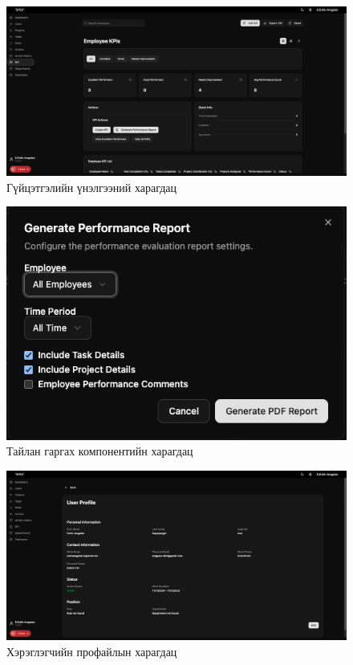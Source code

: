 \begin{figure}[H]
    \centering
    \includegraphics[scale=0.25]{src/images/uiux/kpi.png}
    \caption{Гүйцэтгэлийн үнэлгээний харагдац}
    \label{fig:kpi_page}
\end{figure}

\begin{figure}[H]
    \centering
    \includegraphics[scale=0.25]{src/images/uiux/reportgen.png}
    \caption{Тайлан гаргах компонентийн харагдац}
    \label{fig:report_gen_comp}
\end{figure}

\begin{figure}[H]
    \centering
    \includegraphics[scale=0.25]{src/images/uiux/userProfile.png}
    \caption{Хэрэглэгчийн профайлын харагдац}
    \label{fig:user_profile_page}
\end{figure}
\pagebreak